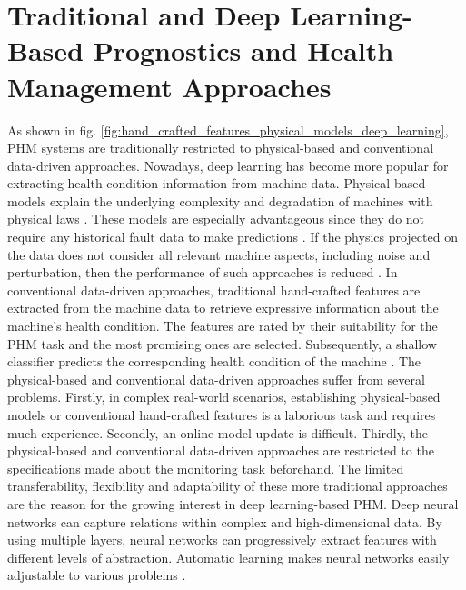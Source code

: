 \section{Traditional and Deep Learning-Based Prognostics and Health Management Approaches}
As shown in fig. \ref{fig:hand_crafted_features_physical_models_deep_learning}, PHM systems are traditionally restricted to physical-based and conventional data-driven approaches. Nowadays, deep learning has become more popular for extracting health condition information from machine data. Physical-based models explain the underlying complexity and degradation of machines with physical laws \cite{ZHAO2019213}. These models are especially advantageous since they do not require any historical fault data to make predictions \cite{Benker2019}. If the physics projected on the data does not consider all relevant machine aspects, including noise and perturbation, then the performance of such approaches is reduced \cite{ZHAO2019213}. In conventional data-driven approaches, traditional hand-crafted features are extracted from the machine data to retrieve expressive information about the machine's health condition. The features are rated by their suitability for the PHM task and the most promising ones are selected. Subsequently, a shallow classifier predicts the corresponding health condition of the machine \cite{ZHAO2019213}. The physical-based and conventional data-driven approaches suffer from several problems. Firstly, in complex real-world scenarios, establishing physical-based models or conventional hand-crafted features is a laborious task and requires much experience. Secondly, an online model update is difficult. Thirdly, the physical-based and conventional data-driven approaches are restricted to the specifications made about the monitoring task beforehand. The limited transferability, flexibility and adaptability of these more traditional approaches are the reason for the growing interest in deep learning-based PHM. Deep neural networks can capture relations within complex and high-dimensional data. By using multiple layers, neural networks can progressively extract features with different levels of abstraction. Automatic learning makes neural networks easily adjustable to various problems \cite{ZHAO2019213}.
